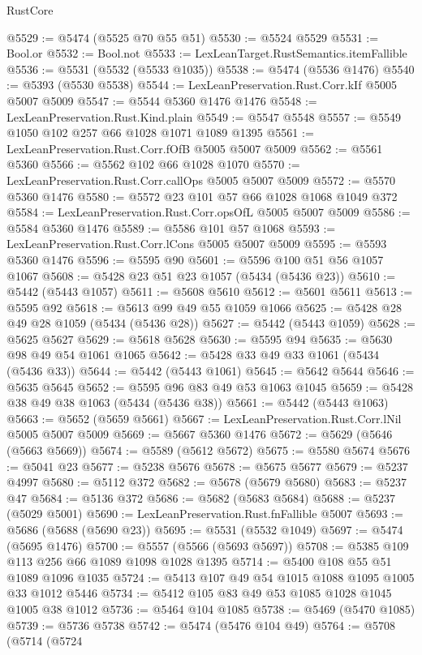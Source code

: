 \begin{lexlean}{RustCore}
\begin{coremodule}
@5529 := @5474 (@5525 @70 @55 @51)
@5530 := @5524 @5529
@5531 := Bool.or
@5532 := Bool.not
@5533 := LexLeanTarget.RustSemantics.itemFallible
@5536 := @5531 (@5532 (@5533 @1035))
@5538 := @5474 (@5536 @1476)
@5540 := @5393 (@5530 @5538)
@5544 := LexLeanPreservation.Rust.Corr.kIf @5005 @5007 @5009
@5547 := @5544 @5360 @1476 @1476
@5548 := LexLeanPreservation.Rust.Kind.plain
@5549 := @5547 @5548
@5557 := @5549 @1050 @102 @257 @66 @1028 @1071 @1089 @1395
@5561 := LexLeanPreservation.Rust.Corr.fOfB @5005 @5007 @5009
@5562 := @5561 @5360
@5566 := @5562 @102 @66 @1028 @1070
@5570 := LexLeanPreservation.Rust.Corr.callOps @5005 @5007 @5009
@5572 := @5570 @5360 @1476
@5580 := @5572 @23 @101 @57 @66 @1028 @1068 @1049 @372
@5584 := LexLeanPreservation.Rust.Corr.opsOfL @5005 @5007 @5009
@5586 := @5584 @5360 @1476
@5589 := @5586 @101 @57 @1068
@5593 := LexLeanPreservation.Rust.Corr.lCons @5005 @5007 @5009
@5595 := @5593 @5360 @1476
@5596 := @5595 @90
@5601 := @5596 @100 @51 @56 @1057 @1067
@5608 := @5428 @23 @51 @23 @1057 (@5434 (@5436 @23))
@5610 := @5442 (@5443 @1057)
@5611 := @5608 @5610
@5612 := @5601 @5611
@5613 := @5595 @92
@5618 := @5613 @99 @49 @55 @1059 @1066
@5625 := @5428 @28 @49 @28 @1059 (@5434 (@5436 @28))
@5627 := @5442 (@5443 @1059)
@5628 := @5625 @5627
@5629 := @5618 @5628
@5630 := @5595 @94
@5635 := @5630 @98 @49 @54 @1061 @1065
@5642 := @5428 @33 @49 @33 @1061 (@5434 (@5436 @33))
@5644 := @5442 (@5443 @1061)
@5645 := @5642 @5644
@5646 := @5635 @5645
@5652 := @5595 @96 @83 @49 @53 @1063 @1045
@5659 := @5428 @38 @49 @38 @1063 (@5434 (@5436 @38))
@5661 := @5442 (@5443 @1063)
@5663 := @5652 (@5659 @5661)
@5667 := LexLeanPreservation.Rust.Corr.lNil @5005 @5007 @5009
@5669 := @5667 @5360 @1476
@5672 := @5629 (@5646 (@5663 @5669))
@5674 := @5589 (@5612 @5672)
@5675 := @5580 @5674
@5676 := @5041 @23
@5677 := @5238 @5676
@5678 := @5675 @5677
@5679 := @5237 @4997
@5680 := @5112 @372
@5682 := @5678 (@5679 @5680)
@5683 := @5237 @47
@5684 := @5136 @372
@5686 := @5682 (@5683 @5684)
@5688 := @5237 (@5029 @5001)
@5690 := LexLeanPreservation.Rust.fnFallible @5007
@5693 := @5686 (@5688 (@5690 @23))
@5695 := @5531 (@5532 @1049)
@5697 := @5474 (@5695 @1476)
@5700 := @5557 (@5566 (@5693 @5697))
@5708 := @5385 @109 @113 @256 @66 @1089 @1098 @1028 @1395
@5714 := @5400 @108 @55 @51 @1089 @1096 @1035
@5724 := @5413 @107 @49 @54 @1015 @1088 @1095 @1005 @33 @1012 @5446
@5734 := @5412 @105 @83 @49 @53 @1085 @1028 @1045 @1005 @38 @1012
@5736 := @5464 @104 @1085
@5738 := @5469 (@5470 @1085)
@5739 := @5736 @5738
@5742 := @5474 (@5476 @104 @49)
@5764 := @5708
    (@5714
      (@5724

\end{coremodule}
\end{lexlean}
